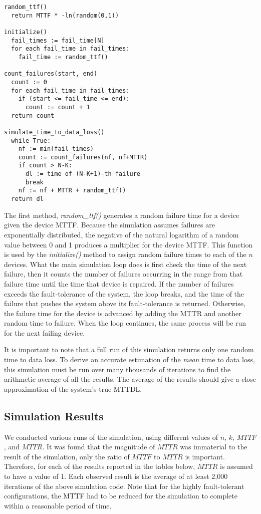 \documentclass[XXX,endnotes]{usetex-v1}
\begin{document}
\begin{small}
\begin{verbatim}
random_ttf()
  return MTTF * -ln(random(0,1))

initialize()
  fail_times := fail_time[N]
  for each fail_time in fail_times:
    fail_time := random_ttf()

count_failures(start, end)
  count := 0
  for each fail_time in fail_times:
    if (start <= fail_time <= end):
      count := count + 1
  return count

simulate_time_to_data_loss()
  while True:
    nf := min(fail_times)
    count := count_failures(nf, nf+MTTR)
    if count > N-K:
      dl := time of (N-K+1)-th failure
      break
    nf := nf + MTTR + random_ttf()
  return dl
\end{verbatim}
\end{small}

The first method, \emph{random\_ttf()} generates a random failure time for a device given the device MTTF.  Because the simulation assumes failures are exponentially distributed, the negative of the natural logarithm of a random value between 0 and 1 produces a multiplier for the device MTTF.  This function is used by the \emph{initialize()} method to assign random failure times to each of the $n$ devices.  What the main simulation loop does is first check the time of the next failure, then it counts the number of failures occurring in the range from that failure time until the time that device is repaired.  If the number of failures exceeds the fault-tolerance of the system, the loop breaks, and the time of the failure that pushes the system above its fault-tolerance is returned.  Otherwise, the failure time for the device is advanced by adding the MTTR and another random time to failure.  When the loop continues, the same process will be run for the next failing device.

It is important to note that a full run of this simulation returns only one random time to data loss.  To derive an accurate estimation of the \emph{mean} time to data loss, this simulation must be run over many thousands of iterations to find the arithmetic average of all the results.  The average of the results should give a close approximation of the system's true MTTDL.

\subsection{Simulation Results}

We conducted various runs of the simulation, using different values of $n$, $k$, $MTTF$, and $MTTR$.  It was found that the magnitude of $MTTR$ was immaterial to the result of the simulation, only the ratio of $MTTF$ to $MTTR$ is important.  Therefore, for each of the results reported in the tables below, $MTTR$ is assumed to have a value of 1.  Each observed result is the average of at least 2,000 iterations of the above simulation code.  Note that for the highly fault-tolerant configurations, the MTTF had to be reduced for the simulation to complete within a reasonable period of time.
\end{document}
